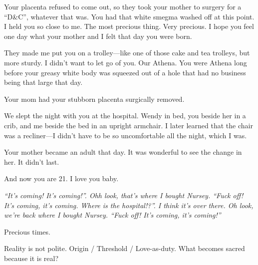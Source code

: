 {\begin{OldSchoolEssay}
Your placenta refused to come out, so they took your mother to surgery for a ``D\&C'', whatever that was. You had that white smegma washed off at this point. I held you so close to me. The most precious thing. Very precious. I hope you feel one day what your mother and I felt that day you were born.

They made me put you on a trolley---like one of those cake and tea trolleys, but more sturdy. I didn't want to let go of you. Our Athena. You were Athena long before your greasy white body was squeezed out of a hole that had no business being that large that day.

Your mom had your stubborn placenta surgically removed.

We slept the night with you at the hospital. Wendy in bed, you beside her in a crib, and me beside the bed in an upright armchair. I later learned that the chair was a recliner---I didn't have to be so uncomfortable all the night, which I was.

\pagebreak
Your mother became an adult that day. It was wonderful to see the change in her. It didn't last.

And now you are 21. I love you baby.

\textit{``It's coming! It's coming!''. Ohh look, that's where I bought Nursey. ``Fuck off! It's coming, it's coming. Where is the hospital!?''. I think it's over there. Oh look, we're back where I bought Nursey. ``Fuck off! It's coming, it's coming!''}

Precious times.
\end{OldSchoolEssay}
}{  Reality is not polite.}{  Origin / Threshold / Love-as-duty.}{  What becomes sacred because it is real?}
